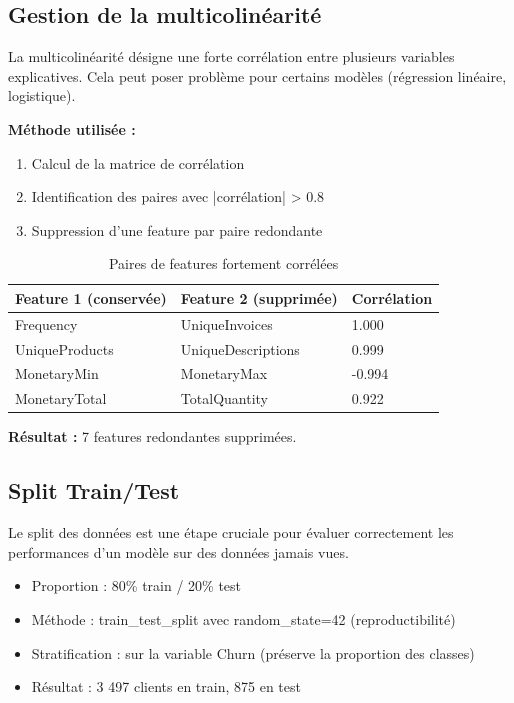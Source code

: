 \documentclass[11pt,a4paper]{article}
\begin{document}
\subsection{Gestion de la multicolinéarité}
La multicolinéarité désigne une forte corrélation entre plusieurs variables explicatives. 
Cela peut poser problème pour certains modèles (régression linéaire, logistique).

\textbf{Méthode utilisée :}
\begin{enumerate}
    \item Calcul de la matrice de corrélation
    \item Identification des paires avec |corrélation| > 0.8
    \item Suppression d'une feature par paire redondante
\end{enumerate}

\begin{table}[H]
\centering
\begin{tabular}{L{5cm} C{4cm} C{2cm}}
\toprule
\textbf{Feature 1 (conservée)} & \textbf{Feature 2 (supprimée)} & \textbf{Corrélation} \\
\midrule
Frequency & UniqueInvoices & 1.000 \\
UniqueProducts & UniqueDescriptions & 0.999 \\
MonetaryMin & MonetaryMax & -0.994 \\
MonetaryTotal & TotalQuantity & 0.922 \\
\bottomrule
\end{tabular}
\caption{Paires de features fortement corrélées}
\end{table}

\textbf{Résultat :} 7 features redondantes supprimées.

\subsection{Split Train/Test}
Le split des données est une étape cruciale pour évaluer correctement les performances 
d'un modèle sur des données jamais vues.

\begin{tcolorbox}[title=✅ Split réalisé]
\begin{itemize}
    \item Proportion : 80\% train / 20\% test
    \item Méthode : train\_test\_split avec random\_state=42 (reproductibilité)
    \item Stratification : sur la variable Churn (préserve la proportion des classes)
    \item Résultat : 3 497 clients en train, 875 en test
\end{itemize}
\end{tcolorbox}
\end{document}
